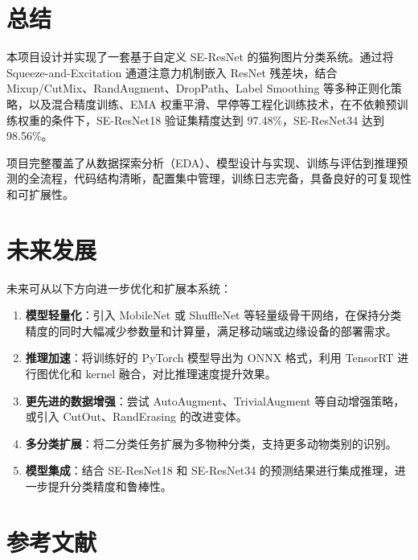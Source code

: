 \documentclass[12pt,a4paper]{ctexart}
\begin{document}
\section{总结}

本项目设计并实现了一套基于自定义 SE-ResNet 的猫狗图片分类系统。通过将 Squeeze-and-Excitation 通道注意力机制嵌入 ResNet 残差块，结合 Mixup/CutMix、RandAugment、DropPath、Label Smoothing 等多种正则化策略，以及混合精度训练、EMA 权重平滑、早停等工程化训练技术，在不依赖预训练权重的条件下，SE-ResNet18 验证集精度达到 97.48\%，SE-ResNet34 达到 98.56\%。

项目完整覆盖了从数据探索分析（EDA）、模型设计与实现、训练与评估到推理预测的全流程，代码结构清晰，配置集中管理，训练日志完备，具备良好的可复现性和可扩展性。


\section{未来发展}

未来可从以下方向进一步优化和扩展本系统：

\begin{enumerate}
    \item \textbf{模型轻量化}：引入 MobileNet 或 ShuffleNet 等轻量级骨干网络，在保持分类精度的同时大幅减少参数量和计算量，满足移动端或边缘设备的部署需求。
    \item \textbf{推理加速}：将训练好的 PyTorch 模型导出为 ONNX 格式，利用 TensorRT 进行图优化和 kernel 融合，对比推理速度提升效果。
    \item \textbf{更先进的数据增强}：尝试 AutoAugment、TrivialAugment 等自动增强策略，或引入 CutOut、RandErasing 的改进变体。
    \item \textbf{多分类扩展}：将二分类任务扩展为多物种分类，支持更多动物类别的识别。
    \item \textbf{模型集成}：结合 SE-ResNet18 和 SE-ResNet34 的预测结果进行集成推理，进一步提升分类精度和鲁棒性。
\end{enumerate}


\newpage
\section*{参考文献}
\end{document}
